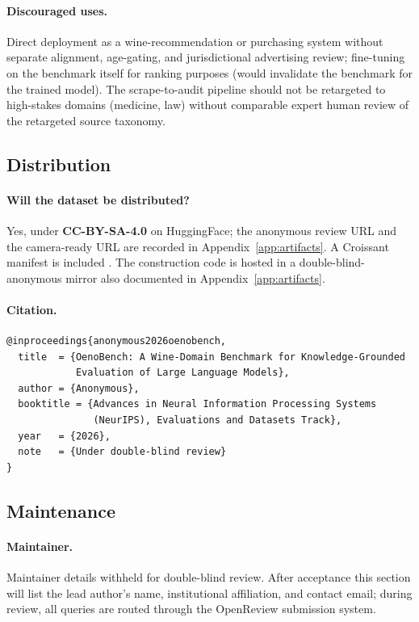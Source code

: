 \paragraph{Discouraged uses.} Direct deployment as a wine-recommendation
or purchasing system without separate alignment, age-gating, and
jurisdictional advertising review; fine-tuning on the benchmark itself
for ranking purposes (would invalidate the benchmark for the trained
model). The scrape-to-audit pipeline should not be retargeted to
high-stakes domains (medicine, law) without comparable expert human
review of the retargeted source taxonomy.

\subsection{Distribution}
\paragraph{Will the dataset be distributed?}
Yes, under \textbf{CC-BY-SA-4.0} on HuggingFace; the anonymous review
URL and the camera-ready URL are recorded in
Appendix~\ref{app:artifacts}. A Croissant manifest is included
\citep{koehn2024croissant}. The construction code is hosted in a
double-blind-anonymous mirror also documented in
Appendix~\ref{app:artifacts}.

\paragraph{Citation.}
\begin{verbatim}
@inproceedings{anonymous2026oenobench,
  title  = {OenoBench: A Wine-Domain Benchmark for Knowledge-Grounded
            Evaluation of Large Language Models},
  author = {Anonymous},
  booktitle = {Advances in Neural Information Processing Systems
               (NeurIPS), Evaluations and Datasets Track},
  year   = {2026},
  note   = {Under double-blind review}
}
\end{verbatim}

\subsection{Maintenance}
\paragraph{Maintainer.}
Maintainer details withheld for double-blind review. After acceptance
this section will list the lead author's name, institutional
affiliation, and contact email; during review, all queries are
routed through the OpenReview submission system.

